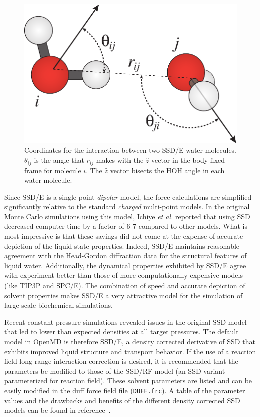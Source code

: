 \documentclass[]{book}
\begin{document}
\begin{figure}
\centering
\includegraphics[width=\linewidth]{waterAngle.pdf}
\caption[Coordinate definition for the SSD/E water model]{Coordinates
for the interaction between two SSD/E water molecules.  $\theta_{ij}$
is the angle that $r_{ij}$ makes with the $\hat{z}$ vector in the
body-fixed frame for molecule $i$.  The $\hat{z}$ vector bisects the
HOH angle in each water molecule. } 
\label{fig:ssd}
\end{figure}


Since SSD/E is a single-point {\it dipolar} model, the force
calculations are simplified significantly relative to the standard
{\it charged} multi-point models. In the original Monte Carlo
simulations using this model, Ichiye {\it et al.} reported that using
SSD decreased computer time by a factor of 6-7 compared to other
models.\cite{liu96:new_model} What is most impressive is that these
savings did not come at the expense of accurate depiction of the
liquid state properties.  Indeed, SSD/E maintains reasonable agreement
with the Head-Gordon diffraction data for the structural features of
liquid water.\cite{hura00,liu96:new_model} Additionally, the dynamical
properties exhibited by SSD/E agree with experiment better than those
of more computationally expensive models (like TIP3P and
SPC/E).\cite{chandra99:ssd_md} The combination of speed and accurate
depiction of solvent properties makes SSD/E a very attractive model
for the simulation of large scale biochemical simulations.

Recent constant pressure simulations revealed issues in the original
SSD model that led to lower than expected densities at all target
pressures.\cite{Ichiye03,fennell04} The default model in {\sc OpenMD}
is therefore SSD/E, a density corrected derivative of SSD that
exhibits improved liquid structure and transport behavior. If the use
of a reaction field long-range interaction correction is desired, it
is recommended that the parameters be modified to those of the SSD/RF
model (an SSD variant parameterized for reaction field). These solvent
parameters are listed and can be easily modified in the {\sc duff}
force field file ({\tt DUFF.frc}).  A table of the parameter values
and the drawbacks and benefits of the different density corrected SSD
models can be found in reference~\cite{fennell04}. 
\end{document}
